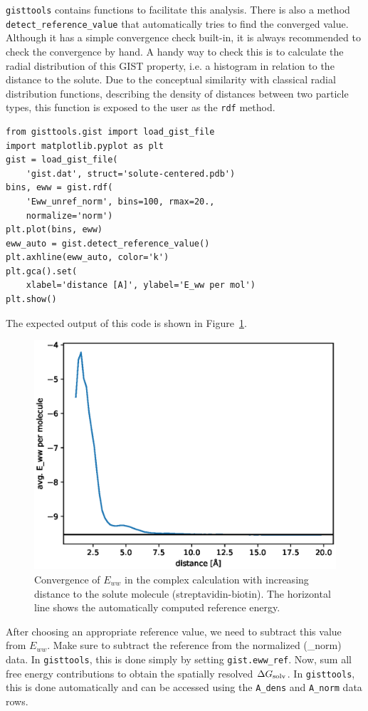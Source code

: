\documentclass[9pt,tutorial]{livecoms}
\newcommand{\dgsolv}{\Delta G_\textup{solv}}
\newcommand{\software}{\texttt}
\newcommand\inlinecode{\texttt}
\begin{document}
\software{gisttools} contains functions to facilitate this analysis.
There is also a method \inlinecode{detect\_reference\_value} that automatically tries to find the converged value.
Although it has a simple convergence check built-in, it is always recommended to check the convergence by hand. A handy way to check this is to calculate the radial distribution of this GIST property, i.e. a histogram in relation to the distance to the solute. Due to the conceptual similarity with classical radial distribution functions, describing the density of distances between two particle types, this function is exposed to the user as the \inlinecode{rdf} method.

\begin{lstlisting}[style=python]
from gisttools.gist import load_gist_file
import matplotlib.pyplot as plt
gist = load_gist_file(
    'gist.dat', struct='solute-centered.pdb')
bins, eww = gist.rdf(
    'Eww_unref_norm', bins=100, rmax=20.,
    normalize='norm')
plt.plot(bins, eww)
eww_auto = gist.detect_reference_value()
plt.axhline(eww_auto, color='k')
plt.gca().set(
    xlabel='distance [A]', ylabel='E_ww per mol')
plt.show()
\end{lstlisting}
The expected output of this code is shown in Figure~\ref{fig_ewwref}.
\begin{figure}
	\centering
	\includegraphics[width=0.8\linewidth]{figures/Eww_convergence.eps}
	\caption{Convergence of $E_{ww}$ in the complex calculation with increasing distance to the solute molecule (streptavidin-biotin). The horizontal line shows the automatically computed reference energy.}\label{fig_ewwref}
\end{figure}

After choosing an appropriate reference value, we need to subtract this value from $E_{ww}$.
Make sure to subtract the reference from the normalized (\_norm) data.
In \software{gisttools}, this is done simply by setting \inlinecode{gist.eww\_ref}.
Now, sum all free energy contributions to obtain the spatially resolved $\dgsolv$.
In \software{gisttools}, this is done automatically and can be accessed using the \inlinecode{A\_dens} and \inlinecode{A\_norm} data rows.
\end{document}
